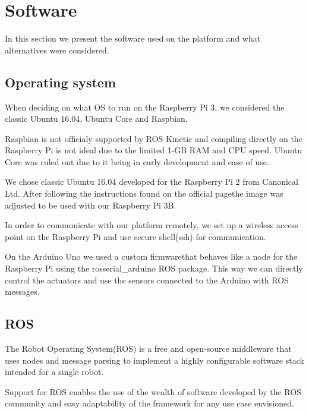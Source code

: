 \documentclass[class=article, crop=false]{standalone}
\begin{document}
\section{Software}\label{sec:software}
In this section we present the software used on the platform and what alternatives were considered.

\subsection{Operating system}\label{subsec:os}
When deciding on what OS to run on the Raspberry Pi 3, we considered the classic Ubuntu 16.04, Ubuntu Core and Raspbian.

Raspbian is not officialy supported by ROS Kinetic and compiling directly on the Raspberry Pi is not ideal due to the limited 1-GB RAM and CPU speed. Ubuntu Core was ruled out due to it being in early development and ease of use.

We chose classic Ubuntu 16.04 developed for the Raspberry Pi 2 from Canonical Ltd. After following the instructions found on the official page\footnotemark the image was adjusted to be used with our Raspberry Pi 3B.

In order to communicate with our platform remotely, we set up a wireless access point on the Raspberry Pi and use secure shell(ssh) for communication.

On the Arduino Uno we used a custom firmware\footnotemark that behaves like a node for the Raspberry Pi using the rosserial\_arduino ROS package. This way we can directly control the actuators and use the sensors connected to the Arduino with ROS messages.


\subsection{ROS}\label{subsec:ros}
The Robot Operating System(ROS) is a free and open-source middleware that uses nodes and message parsing to implement a highly configurable software stack intended for a single robot.

Support for ROS enables the use of the wealth of software developed by the ROS community and easy adaptability of the framework for any use case envisioned.
\end{document}
